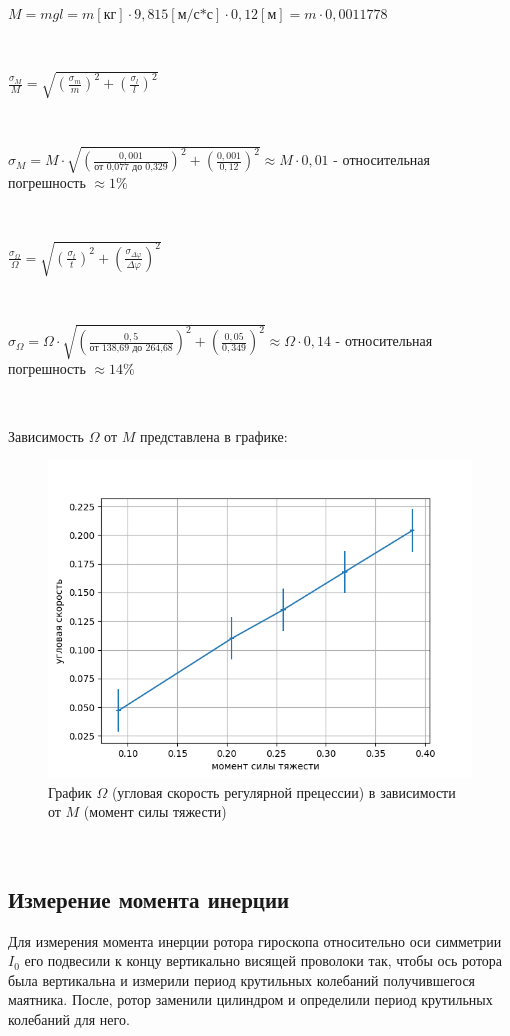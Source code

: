 \documentclass{article}
\begin{document}
\

$M = mgl = m[\text{кг}]\cdot9,815[\text{м/с*с}]\cdot0,12[\text{м}] = m \cdot 0,0011778$

\

$\frac{\sigma_M}{M} = \sqrt{(\frac{\sigma_m}{m})^2 + (\frac{\sigma_l}{l})^2}$

\

$\sigma_M = M\cdot\sqrt{(\frac{0,001}{\text{от 0,077 до 0,329}})^2 + (\frac{0,001}{0,12})^2} \approx M \cdot 0,01$ - относительная погрешность $\approx 1\%$

\

$\frac{\sigma_{\Omega}}{\Omega} = \sqrt{(\frac{\sigma_t}{t})^2 + (\frac{\sigma_{\Delta\varphi}}{\Delta\varphi})^2}$

\

$\sigma_{\Omega} = \Omega \cdot \sqrt{(\frac{0,5}{\text{от 138,69 до 264,68}})^2 + (\frac{0,05}{0,349})^2} \approx \Omega \cdot 0,14$ - относительная погрешность $\approx 14\%$

\

\noindent
Зависимость $\Omega$ от $M$ представлена в графике:

\begin{figure}[h]
    \centering
    \includegraphics[width=0.75\linewidth]{Figure_1.png}
    \caption{График $\Omega$ (угловая скорость регулярной прецессии) в зависимости от $M$ (момент силы тяжести)}
\end{figure}

\

\subsection*{Измерение момента инерции}
Для измерения момента инерции ротора гироскопа относительно оси симметрии $I_0$ его подвесили к концу вертикально висящей проволоки так, чтобы ось ротора была вертикальна и измерили период крутильных колебаний получившегося маятника. После, ротор заменили цилиндром и определили период крутильных колебаний для него. 
\end{document}
